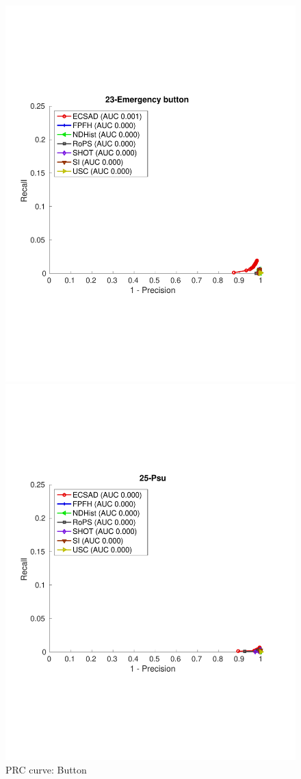 \documentclass[10pt,twocolumn,letterpaper]{article}
\begin{document}
\begin{figure}[h]
\begin{minipage}[b]{.3\textwidth}
\includegraphics[clip, trim=0.7cm 6cm 0.7cm 6cm,width=1.0\linewidth, height= 1.0\linewidth, keepaspectratio]{img/23-Emergency_button_L2_RATIO_zoom.pdf} 
\caption{PRC curve: Button }\label{fig:button}
\end{minipage}\qquad
\begin{minipage}[b]{.3\textwidth}
\includegraphics[clip, trim=0.7cm 6cm 0.7cm 6cm,width=1.0\linewidth, height= 1.0\linewidth, keepaspectratio]{img/25-Psu_L2_RATIO_zoom.pdf}

\end{minipage}
\end{figure}
\end{document}
